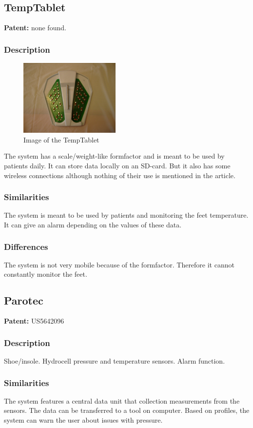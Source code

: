 \subsection{TempTablet}
\textbf{Patent:} none found.
\subsubsection{Description}
\begin{figure}
\includegraphics[width=5cm]{billeder/temptablet}
\caption{Image of the TempTablet}
\end{figure}
The system has a scale/weight-like formfactor and is meant to be used by patients daily. It can store data locally on an SD-card. But it also has some wireless connections although nothing of their use is mentioned in the article.
\subsubsection{Similarities}
The system is meant to be used by patients and monitoring the feet temperature. It can give an alarm depending on the values of these data.
\subsubsection{Differences}
The system is not very mobile because of the formfactor. Therefore it cannot constantly monitor the feet.\\


\subsection{Parotec}
\textbf{Patent:} US5642096
\subsubsection{Description}
Shoe/insole. Hydrocell pressure and temperature sensors. Alarm function.
\subsubsection{Similarities}
The system features a central data unit that collection measurements from the sensors. The data can be transferred to a tool on computer. Based on profiles, the system can warn the user about issues with pressure. 
